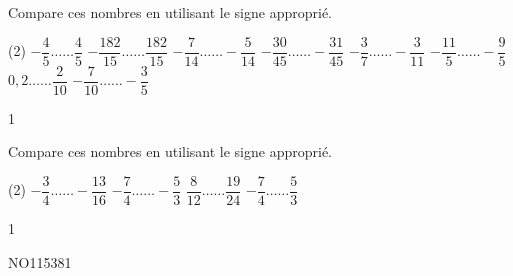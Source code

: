 \documentclass[a4paper,11pt]{report}
\begin{document}
\begin{exop}{
Compare ces nombres en utilisant le signe approprié. 
\begin{tasks}(2)
\task $-\dfrac{4}{5}\ldots \ldots \dfrac{4}{5} $
\task $-\dfrac{182}{15}\ldots \ldots \dfrac{182}{15} $
     \task $-\dfrac{7}{14}\ldots \ldots -\dfrac{5}{14} $
	\task $-\dfrac{30}{45}\ldots\ldots 
 -\dfrac{31}{45}$
	\task $-\dfrac{3}{7}\ldots \ldots -\dfrac{3}{11}$
   \task $-\dfrac{11}{5}\ldots \ldots -\dfrac{9}{5} $
 \task $0,2 \ldots \ldots \dfrac{2}{10} $
	\task $-\dfrac{7}{10}\ldots \ldots -\dfrac{3}{5} $
\end{tasks}
}{1}
\end{exop}

\begin{exop}{
Compare ces nombres en utilisant le signe approprié. 
\begin{tasks}(2)
	\task $-\dfrac{3}{4}\ldots \ldots -\dfrac{13}{16} $
    \task $-\dfrac{7}{4}\ldots \ldots -\dfrac{5}{3} $
	\task $\dfrac{8}{12}\ldots \ldots \dfrac{19}{24} $
	\task $-\dfrac{7}{4}\ldots \ldots \dfrac{5}{3} $

\end{tasks}
}{1}
\end{exop}


\begin{exol}{NO115}{38}{1}
\end{exol}
\end{document}
